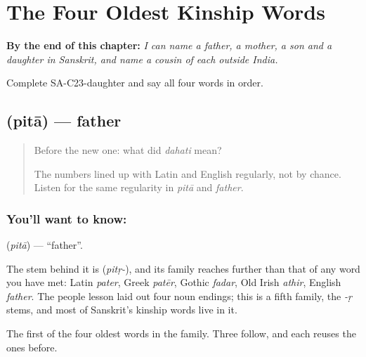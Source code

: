 
\chapter{The Four Oldest Kinship Words}
\label{ch:sa-kinship}

\begin{chapteropening}
\textbf{By the end of this chapter:} \emph{I can name a father, a mother, a son and a daughter in Sanskrit, and name a cousin of each outside India.}

Complete SA-C23-daughter and say all four words in order.
\end{chapteropening}

\section[\texorpdfstring{\sk{पिता} (pitā)}{पिता (pitā)}]{ (pitā) — father}

\label{lesson:SA-C23-father}



\begin{quote}
Before the new one: what did \emph{dahati} mean?

The numbers lined up with Latin and English regularly, not by chance. Listen for the same regularity in \emph{pitā} and \emph{father}.
\end{quote}

\subsection*{You'll want to know: }
\textbf{} (\emph{pitā}) — \textquotedblleft{}father\textquotedblright{}.

The stem behind it is \textbf{} (\emph{pitṛ-}), and its family reaches further than that of any word you have met: Latin \emph{pater}, Greek \emph{patēr}, Gothic \emph{fadar}, Old Irish \emph{athir}, English \emph{father}. The people lesson laid out four noun endings; this is a fifth family, the \emph{-ṛ} stems, and most of Sanskrit's kinship words live in it.

\begin{grammarlens}[title={What you've built}]
The first of the four oldest words in the family. Three follow, and each reuses the ones before.
\end{grammarlens}

